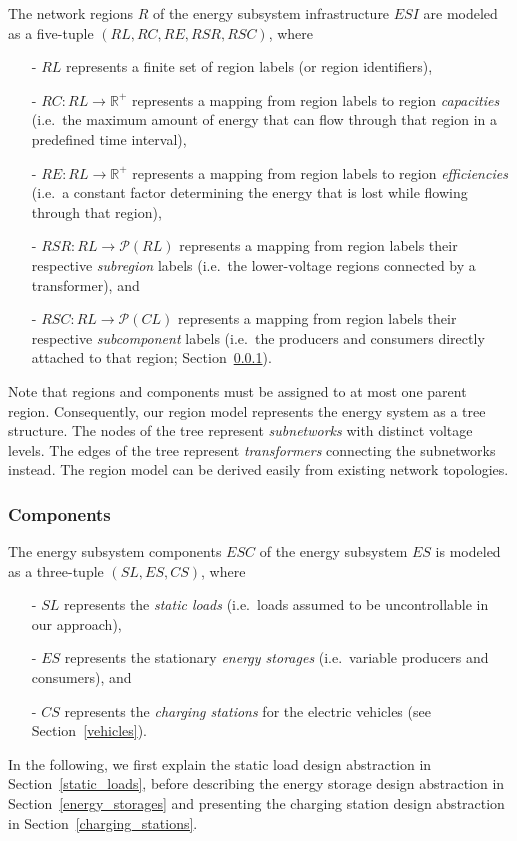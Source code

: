 The network regions $R$ of the energy subsystem infrastructure $ESI$ are modeled as a five-tuple $(RL, RC, RE, RSR, RSC)$, where
\begin{itemize}
	\item[-] $RL$ represents a finite set of region labels (or region identifiers),
	\item[-] $RC: RL \rightarrow \mathbb{R}^+$ represents a mapping from region labels to region \textit{capacities} (i.e.\ the maximum amount of energy that can flow through that region in a predefined time interval),
	\item[-] $RE: RL \rightarrow \mathbb{R}^+$ represents a mapping from region labels to region \textit{efficiencies} (i.e.\ a constant factor determining the energy that is lost while flowing through that region),
	\item[-] $RSR: RL \rightarrow \mathcal{P}(RL)$ represents a mapping from region labels their respective \textit{subregion} labels (i.e.\ the lower-voltage regions connected by a transformer), and
	\item[-] $RSC: RL \rightarrow \mathcal{P}(CL)$ represents a mapping from region labels their respective \textit{subcomponent} labels (i.e.\ the producers and consumers directly attached to that region; Section~\ref{components}).
\end{itemize}
Note that regions and components must be assigned to at most one parent region. Consequently, our region model represents the energy system as a tree structure. The nodes of the tree represent \textit{subnetworks} with distinct voltage levels. The edges of the tree represent \textit{transformers} connecting the subnetworks instead. The region model can be derived easily from existing network topologies.

\subsubsection{Components}
\label{components}

The energy subsystem components $ESC$ of the energy subsystem $ES$ is modeled as a three-tuple $(SL, ES, CS)$, where
\begin{itemize}
	\item[-] $SL$ represents the \textit{static loads} (i.e.\ loads assumed to be uncontrollable in our approach),
	\item[-] $ES$ represents the stationary \textit{energy storages} (i.e.\ variable producers and consumers), and
	\item[-] $CS$ represents the \textit{charging stations} for the electric vehicles (see Section~\ref{vehicles}).
\end{itemize}
In the following, we first explain the static load design abstraction in Section~\ref{static_loads}, before describing the energy storage design abstraction in Section~\ref{energy_storages} and presenting the charging station design abstraction in Section~\ref{charging_stations}.

